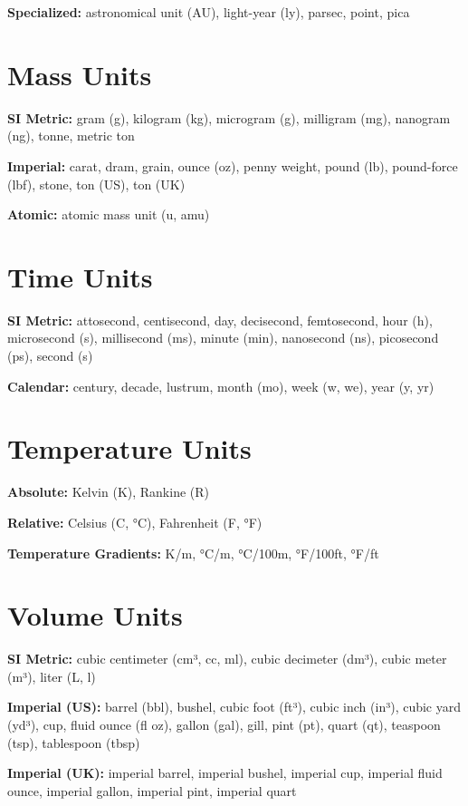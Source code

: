 \documentclass[11pt,a4paper]{report}
\begin{document}
\textbf{Specialized:} astronomical unit (AU), light-year (ly), parsec, point, pica

\section{Mass Units}

\textbf{SI Metric:} gram (g), kilogram (kg), microgram (\textmu g), milligram (mg), nanogram (ng), tonne, metric ton

\textbf{Imperial:} carat, dram, grain, ounce (oz), penny weight, pound (lb), pound-force (lbf), stone, ton (US), ton (UK)

\textbf{Atomic:} atomic mass unit (u, amu)

\section{Time Units}

\textbf{SI Metric:} attosecond, centisecond, day, decisecond, femtosecond, hour (h), microsecond (\textmu s), millisecond (ms), minute (min), nanosecond (ns), picosecond (ps), second (s)

\textbf{Calendar:} century, decade, lustrum, month (mo), week (w, we), year (y, yr)

\section{Temperature Units}

\textbf{Absolute:} Kelvin (K), Rankine (R)

\textbf{Relative:} Celsius (C, °C), Fahrenheit (F, °F)

\textbf{Temperature Gradients:} K/m, °C/m, °C/100m, °F/100ft, °F/ft

\section{Volume Units}

\textbf{SI Metric:} cubic centimeter (cm³, cc, ml), cubic decimeter (dm³), cubic meter (m³), liter (L, l)

\textbf{Imperial (US):} barrel (bbl), bushel, cubic foot (ft³), cubic inch (in³), cubic yard (yd³), cup, fluid ounce (fl oz), gallon (gal), gill, pint (pt), quart (qt), teaspoon (tsp), tablespoon (tbsp)

\textbf{Imperial (UK):} imperial barrel, imperial bushel, imperial cup, imperial fluid ounce, imperial gallon, imperial pint, imperial quart
\end{document}
